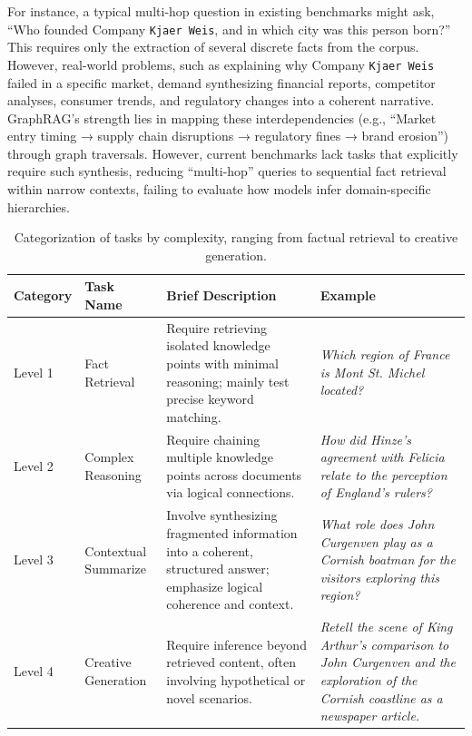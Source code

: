 \documentclass{article} %
\begin{document}
For instance, a typical multi-hop question in existing benchmarks might ask, ``Who founded Company \texttt{Kjaer Weis}, and in which city was this person born\textnormal{?}'' This requires only the extraction of several discrete facts from the corpus. However, real-world problems, such as explaining why Company \texttt{Kjaer Weis} failed in a specific market, demand synthesizing financial reports, competitor analyses, consumer trends, and regulatory changes into a coherent narrative. GraphRAG’s strength lies in mapping these interdependencies (e.g., ``Market entry timing → supply chain disruptions → regulatory fines → brand erosion'') through graph traversals. However, current benchmarks lack tasks that explicitly require such synthesis, reducing ``multi-hop'' queries to sequential fact retrieval within narrow contexts, failing to evaluate how models infer domain-specific hierarchies. 
\begin{table}[htbp]
\centering
\caption{Categorization of tasks by complexity, ranging from factual retrieval to creative generation.
}
\scriptsize
\renewcommand{\arraystretch}{1} 
\begin{tabularx}{\textwidth}{@{}>{\raggedright\arraybackslash}p{1.2cm}>{\raggedright\arraybackslash}p{2.5cm}>{\raggedright\arraybackslash}X>{\raggedright\arraybackslash}p{4.5cm}@{}}
\toprule
\rowcolor{white}
\textbf{Category} & \textbf{Task Name} & \textbf{Brief Description} & \textbf{Example} \\
\midrule
Level 1 & Fact Retrieval& 
Require retrieving isolated knowledge points with minimal reasoning; mainly test precise keyword matching. & 
\textit{Which region of France is Mont St. Michel located?} \\

Level 2 & Complex Reasoning& 
Require chaining multiple knowledge points across documents via logical connections. & 
\textit{How did Hinze’s agreement with Felicia relate to the perception of England’s rulers?} \\

Level 3 & Contextual Summarize& 
Involve synthesizing fragmented information into a coherent, structured answer; emphasize logical coherence and context. & 
\textit{What role does John Curgenven play as a Cornish boatman for the visitors exploring this region?} \\

Level 4 & Creative Generation& 
Require inference beyond retrieved content, often involving hypothetical or novel scenarios. & 
\textit{Retell the scene of King Arthur’s comparison to John Curgenven and the exploration of the Cornish coastline as a newspaper article.} \\
\bottomrule
\end{tabularx}
\label{tab:task_levels}
\end{table}
\end{document}
